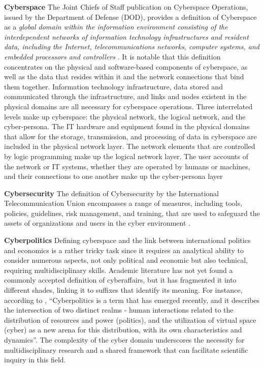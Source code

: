 \textbf{Cyberspace} The Joint Chiefs of Staff publication on Cyberspace Operations, issued by the Department of Defense (DOD), provides a definition of Cyberspace as a \textit{global domain within the information environment consisting of the interdependent networks of information technology infrastructures and resident data, including the Internet, telecommunications networks, computer systems, and embedded processors and controllers} \autocite[GL-4]{jointchiefsofstaff_2018_cyberspace}. It is notable that this definition concentrates on the physical and software-based components of cyberspace, as well as the data that resides within it and the network connections that bind them together. Information technology infrastructure, data stored and communicated through the infrastructure, and links and nodes existent in the physical domains are all necessary for cyberspace operations. Three interrelated levels make up cyberspace: the physical network, the logical network, and the cyber-persona. The IT hardware and equipment found in the physical domains that allow for the storage, transmission, and processing of data in cyberspace are included in the physical network layer. The network elements that are controlled by logic programming make up the logical network layer. The user accounts of the network or IT systems, whether they are operated by humans or machines, and their connections to one another make up the cyber-persona layer \autocite{jointchiefsofstaff_2018_cyberspace}

\vspace{0.2cm}
\textbf{Cybersecurity} The definition of Cybersecurity by the International Telecommunication Union encompasses a range of measures, including tools, policies, guidelines, risk management, and training, that are used to safeguard the assets of organizations and users in the cyber environment \autocite[2]{internationaltelecommunicationunion_2008_recommendation}. 

\vspace{0.2cm}

\textbf{Cyberpolitics} Defining cyberspace and the link between international politics and economics is a rather tricky task since it requires an analytical ability to consider numerous aspects, not only political and economic but also technical, requiring multidisciplinary skills. Academic literature has not yet found a commonly accepted definition of cyberaffairs, but it has fragmented it into different shades, linking it to suffixes that identify its meaning. For instance, according to \textcite[4]{nazlichoucri_2012_cyberpolitics}, “Cyberpolitics is a term that has emerged recently, and it describes the intersection of two distinct realms - human interactions related to the distribution of resources and power (politics), and the utilization of virtual space (cyber) as a new arena for this distribution, with its own characteristics and dynamics”. The complexity of the cyber domain underscores the necessity for multidisciplinary research and a shared framework that can facilitate scientific inquiry in this field. 

